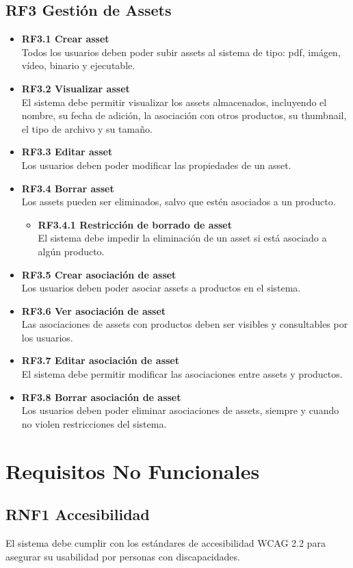 \subsection*{RF3 Gestión de Assets}

\begin{itemize}
    \item \textbf{RF3.1 Crear asset} \\
    Todos los usuarios deben poder subir assets al sistema de tipo: pdf, imágen, vídeo, binario y ejecutable.

    \item \textbf{RF3.2 Visualizar asset} \\
    El sistema debe permitir visualizar los assets almacenados, incluyendo el nombre, su fecha de adición, la asociación con otros productos, su thumbnail, el tipo de archivo y su tamaño.

    \item \textbf{RF3.3 Editar asset} \\
    Los usuarios deben poder modificar las propiedades de un asset.

    \item \textbf{RF3.4 Borrar asset} \\
    Los assets pueden ser eliminados, salvo que estén asociados a un producto.
    \begin{itemize}
        \item \textbf{RF3.4.1 Restricción de borrado de asset} \\
        El sistema debe impedir la eliminación de un asset si está asociado a algún producto.
    \end{itemize}

    \item \textbf{RF3.5 Crear asociación de asset} \\
    Los usuarios deben poder asociar assets a productos en el sistema.

    \item \textbf{RF3.6 Ver asociación de asset} \\
    Las asociaciones de assets con productos deben ser visibles y consultables por los usuarios.

    \item \textbf{RF3.7 Editar asociación de asset} \\
    El sistema debe permitir modificar las asociaciones entre assets y productos.

    \item \textbf{RF3.8 Borrar asociación de asset} \\
    Los usuarios deben poder eliminar asociaciones de assets, siempre y cuando no violen restricciones del sistema.
\end{itemize}


\section*{Requisitos No Funcionales}
\subsection*{RNF1 Accesibilidad}
El sistema debe cumplir con los estándares de accesibilidad WCAG 2.2 para asegurar su usabilidad por personas con discapacidades.
